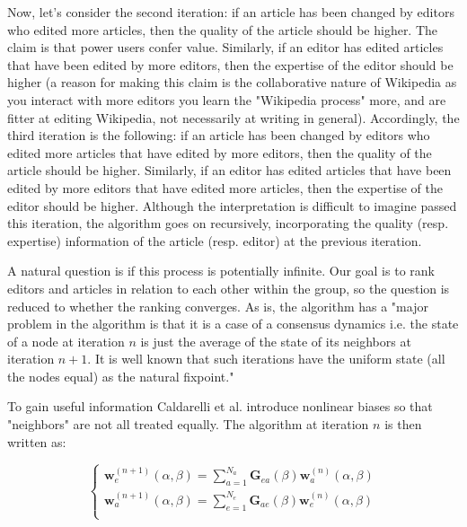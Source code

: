 Now, let's consider the second iteration:  if an article has been changed by editors who edited more articles, then the quality of the article should be higher. The claim is that power users confer value. Similarly, if an editor has edited articles that have been edited by more editors, then the expertise of the editor should be higher (a reason for making this claim is the collaborative nature of Wikipedia as you interact with more editors you learn the "Wikipedia process" more, and are fitter at editing Wikipedia, not necessarily at writing in general). 
Accordingly, the third iteration is the following: if an article has been changed by editors who edited more articles that have edited by more editors, then the quality of the article should be higher. Similarly, if an editor has edited articles that have been edited by more editors that have edited more articles, then the expertise of the editor should be higher. Although the interpretation is difficult to imagine passed this iteration, the algorithm goes on recursively, incorporating the quality (resp. expertise) information of the article (resp. editor) at the previous iteration.

A natural question is if this process is potentially infinite. Our goal is to rank editors and articles in relation to each other within the group, so the question is reduced to whether the ranking converges. As is, the algorithm
has a "major problem in the algorithm is that it is a case of a
consensus dynamics i.e. the state of a node at iteration $n$ is just
the average of the state of its neighbors at iteration $n+1$. It is well
known that such iterations have the uniform state (all the nodes
equal) as the natural fixpoint." \cite{caldarelli2012network}

To gain useful information Caldarelli et al. introduce nonlinear biases so that "neighbors" are not all treated equally. The algorithm at iteration $n$ is then written as:

\begin{equation}
\begin{cases}
 \mathbf{w}^{(n+1)}_e (\alpha,\beta) = \sum_{a=1}^{N_a}  \mathbf{G}_{ea}(\beta) \mathbf{w}^{(n)}_a (\alpha,\beta)\\
\mathbf{w}^{(n+1)}_a (\alpha,\beta) = \sum_{e=1}^{N_e}  \mathbf{G}_{ae}(\beta) \mathbf{w}^{(n)}_e (\alpha,\beta)\\
\end{cases}
\label{random_walker}
\end{equation}

